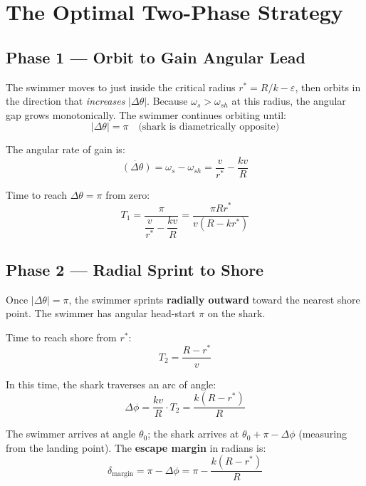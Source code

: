 \documentclass[12pt, a4paper]{article}
\theoremstyle{definition}
\newcommand{\abs}[1]{\left|#1\right|}
\begin{document}
\section{The Optimal Two-Phase Strategy}

\subsection*{Phase 1 — Orbit to Gain Angular Lead}

The swimmer moves to just inside the critical radius $r^* = R/k - \varepsilon$, then orbits in the direction that \emph{increases} $\abs{\Delta\theta}$. Because $\omega_s > \omega_{sh}$ at this radius, the angular gap grows monotonically. The swimmer continues orbiting until:
\[
  \abs{\Delta\theta} = \pi
  \quad\text{(shark is diametrically opposite)}
\]

The angular rate of gain is:
\[
  \dot{(\Delta\theta)} = \omega_s - \omega_{sh} = \frac{v}{r^*} - \frac{kv}{R}
\]

Time to reach $\Delta\theta = \pi$ from zero:
\[
  T_1 = \frac{\pi}{\dfrac{v}{r^*} - \dfrac{kv}{R}}
  = \frac{\pi R r^*}{v(R - kr^*)}
\]

\subsection*{Phase 2 — Radial Sprint to Shore}

Once $\abs{\Delta\theta} = \pi$, the swimmer sprints \textbf{radially outward} toward the nearest shore point. The swimmer has angular head-start $\pi$ on the shark.

\medskip
\noindent Time to reach shore from $r^*$:
\[
  T_2 = \frac{R - r^*}{v}
\]

\noindent In this time, the shark traverses an arc of angle:
\[
  \Delta\phi = \frac{kv}{R} \cdot T_2 = \frac{k(R - r^*)}{R}
\]

\noindent The swimmer arrives at angle $\theta_0$; the shark arrives at $\theta_0 + \pi - \Delta\phi$ (measuring from the landing point). The \textbf{escape margin} in radians is:
\[
  \boxed{
    \delta_{\text{margin}} = \pi - \Delta\phi = \pi - \frac{k(R - r^*)}{R}
  }
\]
\end{document}
